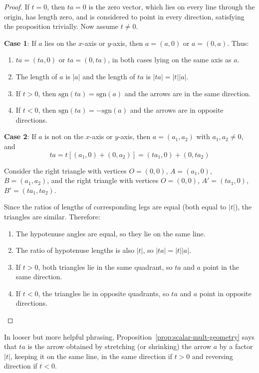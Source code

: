 \begin{proof}
    If $t = 0$, then $ta = 0$ is the zero vector, which lies on every line through the origin, has length zero, and is considered to point in every direction, satisfying the proposition trivially. Now assume $t \neq 0$.
    
    \textbf{Case 1}: If $a$ lies on the $x$-axis or $y$-axis, then $a = (a, 0)$ or $a = (0, a)$. Thus:
    \begin{enumerate}[label=\roman*.]
        \item $ta = (ta, 0)$ or $ta = (0, ta)$, in both cases lying on the same axis as $a$.
        \item The length of $a$ is $|a|$ and the length of $ta$ is $|ta| = |t||a|$.
        \item If $t > 0$, then $\text{sgn}(ta) = \text{sgn}(a)$ and the arrows are in the same direction.
        \item If $t < 0$, then $\text{sgn}(ta) = -\text{sgn}(a)$ and the arrows are in opposite directions.
    \end{enumerate}
    
    \textbf{Case 2}: If $a$ is not on the $x$-axis or $y$-axis, then $a = (a_1, a_2)$ with $a_1, a_2 \neq 0$, and
    \[
    ta = t[(a_1, 0) + (0, a_2)] = (ta_1, 0) + (0, ta_2)
    \]
    
    Consider the right triangle with vertices $O = (0, 0)$, $A = (a_1, 0)$, $B = (a_1, a_2)$, and the right triangle with vertices $O = (0, 0)$, $A' = (ta_1, 0)$, $B' = (ta_1, ta_2)$.
    
    Since the ratios of lengths of corresponding legs are equal (both equal to $|t|$), the triangles are similar. Therefore:
    \begin{enumerate}[label=\roman*.]
        \item The hypotenuse angles are equal, so they lie on the same line.
        \item The ratio of hypotenuse lengths is also $|t|$, so $|ta| = |t||a|$.
        \item If $t > 0$, both triangles lie in the same quadrant, so $ta$ and $a$ point in the same direction.
        \item If $t < 0$, the triangles lie in opposite quadrants, so $ta$ and $a$ point in opposite directions.
    \end{enumerate}
\end{proof}

\begin{note}
    In looser but more helpful phrasing, Proposition~\ref{prop:scalar-mult-geometry} says that $ta$ is the arrow obtained by stretching (or shrinking) the arrow $a$ by a factor $|t|$, keeping it on the same line, in the same direction if $t > 0$ and reversing direction if $t < 0$.
\end{note}
